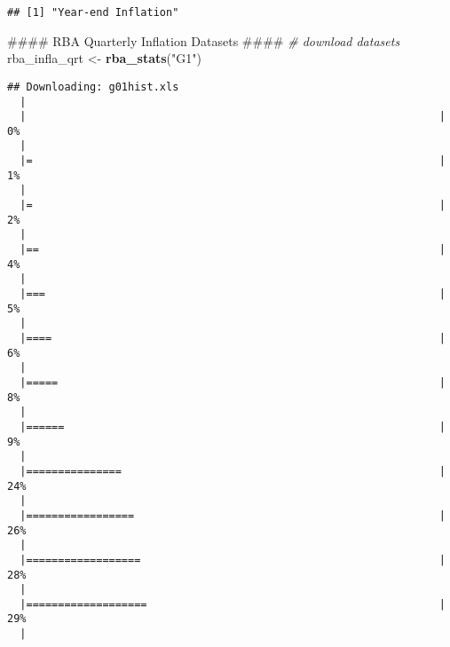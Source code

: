 \documentclass[]{article}
\newenvironment{Shaded}{\begin{snugshade}}{\end{snugshade}}
\newcommand{\KeywordTok}[1]{\textcolor[rgb]{0.13,0.29,0.53}{\textbf{#1}}}
\newcommand{\StringTok}[1]{\textcolor[rgb]{0.31,0.60,0.02}{#1}}
\newcommand{\CommentTok}[1]{\textcolor[rgb]{0.56,0.35,0.01}{\textit{#1}}}
\newcommand{\NormalTok}[1]{#1}
\begin{document}
\begin{verbatim}
## [1] "Year-end Inflation"
\end{verbatim}

\begin{Shaded}
\begin{Highlighting}[]
\NormalTok{    #### RBA Quarterly Inflation Datasets ####}
      \CommentTok{# download datasets}
\NormalTok{      rba_infla_qrt <-}\StringTok{ }\KeywordTok{rba_stats}\NormalTok{(}\StringTok{"G1"}\NormalTok{)}
\end{Highlighting}
\end{Shaded}

\begin{verbatim}
## Downloading: g01hist.xls
  |                                                                       
  |                                                                 |   0%
  |                                                                       
  |=                                                                |   1%
  |                                                                       
  |=                                                                |   2%
  |                                                                       
  |==                                                               |   4%
  |                                                                       
  |===                                                              |   5%
  |                                                                       
  |====                                                             |   6%
  |                                                                       
  |=====                                                            |   8%
  |                                                                       
  |======                                                           |   9%
  |                                                                       
  |===============                                                  |  24%
  |                                                                       
  |=================                                                |  26%
  |                                                                       
  |==================                                               |  28%
  |                                                                       
  |===================                                              |  29%
  |                                                                       

\end{verbatim}
\end{document}
